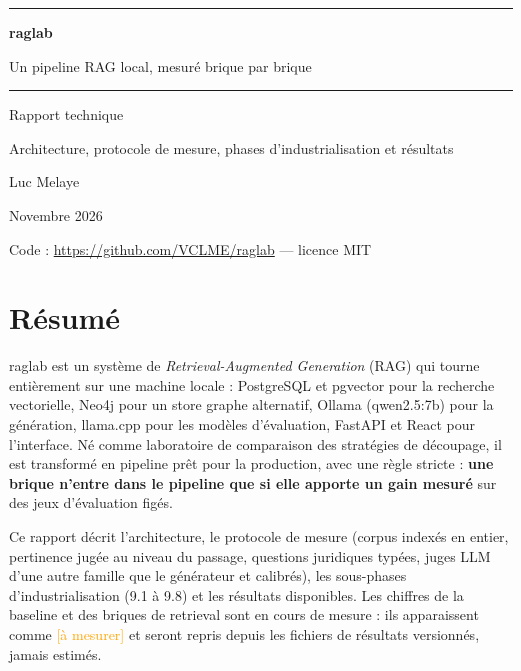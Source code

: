 \documentclass[11pt,a4paper]{article}
\newcommand{\aMesurer}[1][à mesurer]{\textcolor{orange}{\textsf{\small[#1]}}}
\begin{document}
\hypersetup{pageanchor=false}
\begin{titlepage}
  \thispagestyle{empty}
  \vspace*{3cm}
  {\color{accent}\rule{\linewidth}{1.2pt}}\par\vspace{0.8cm}
  {\fontsize{40}{44}\selectfont\bfseries\color{accent} raglab\par}
  \vspace{0.4cm}
  {\LARGE Un pipeline RAG local, mesuré brique par brique\par}
  \vspace{0.8cm}
  {\color{accent}\rule{\linewidth}{1.2pt}}\par
  \vspace{1.2cm}
  {\large Rapport technique\par}
  \vspace{0.3cm}
  {\color{gris} Architecture, protocole de mesure, phases d'industrialisation et résultats\par}
  \vfill
  {\large Luc Melaye\par}
  \vspace{0.2cm}
  {\color{gris} Novembre 2026\par}
  \vspace{0.6cm}
  {\small\color{gris} Code : \url{https://github.com/VCLME/raglab} --- licence MIT\par}
\end{titlepage}
\hypersetup{pageanchor=true}

\section*{Résumé}

raglab est un système de \emph{Retrieval-Augmented Generation} (RAG) qui tourne entièrement sur une machine locale : PostgreSQL et pgvector pour la recherche vectorielle, Neo4j pour un store graphe alternatif, Ollama (qwen2.5:7b) pour la génération, llama.cpp pour les modèles d'évaluation, FastAPI et React pour l'interface. Né comme laboratoire de comparaison des stratégies de découpage, il est transformé en pipeline prêt pour la production, avec une règle stricte : \textbf{une brique n'entre dans le pipeline que si elle apporte un gain mesuré} sur des jeux d'évaluation figés.

Ce rapport décrit l'architecture, le protocole de mesure (corpus indexés en entier, pertinence jugée au niveau du passage, questions juridiques typées, juges LLM d'une autre famille que le générateur et calibrés), les sous-phases d'industrialisation (9.1 à 9.8) et les résultats disponibles. Les chiffres de la baseline et des briques de retrieval sont en cours de mesure : ils apparaissent comme \aMesurer{} et seront repris depuis les fichiers de résultats versionnés, jamais estimés.
\end{document}
